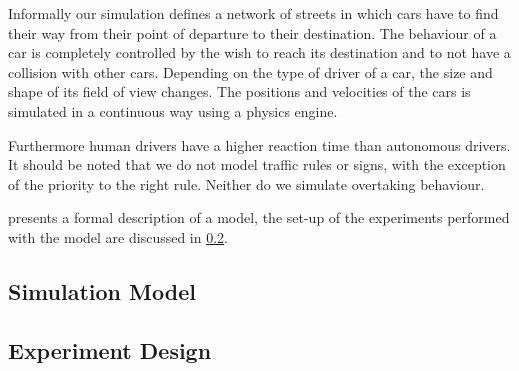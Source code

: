 Informally our simulation defines a network of streets in which cars have to find their way from their point of departure to their destination. The behaviour of a car is completely controlled by the wish to reach its destination and to not have a collision with other cars. Depending on the type of driver of a car, the size and shape of its field of view changes. The positions and velocities of the cars is simulated in a continuous way using a physics engine. 

Furthermore human drivers have a higher reaction time than autonomous drivers. It should be noted that we do not model traffic rules or signs, with the exception of the priority to the right rule. Neither do we simulate overtaking behaviour.

 presents a formal description of a model, the set-up of the experiments performed with the model are discussed in \cref{sub:method:design}.

\subsection{Simulation Model}
\label{sub:method:model}



\subsection{Experiment Design}
\label{sub:method:design}
